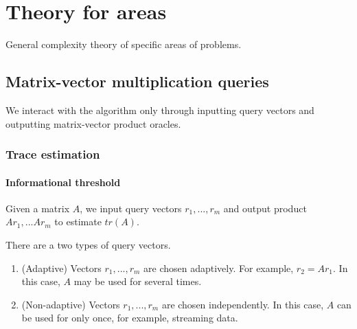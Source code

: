 \chapter{Theory for areas}
General complexity theory of specific areas of problems. 

\section{Matrix-vector multiplication queries}
We interact with the algorithm only through inputting query vectors and outputting matrix-vector product oracles. 

\subsection{Trace estimation}
\subsubsection{Informational threshold}
\begin{prob}
\label{tr_est}
Given a matrix $A$, we input query vectors $r_1,...,r_m$ and output product $Ar_1,...Ar_m$ to estimate $tr(A)$. 
\end{prob}


There are a two types of query vectors.
\begin{enumerate}
    \item (Adaptive) Vectors $r_1,...,r_m$ are chosen adaptively. For example, $r_2=Ar_1$. In this case, $A$ may be used for several times.
    \item (Non-adaptive) Vectors $r_1,...,r_m$ are chosen independently. In this case, $A$ can be used for only once, for example, streaming data.
\end{enumerate}

